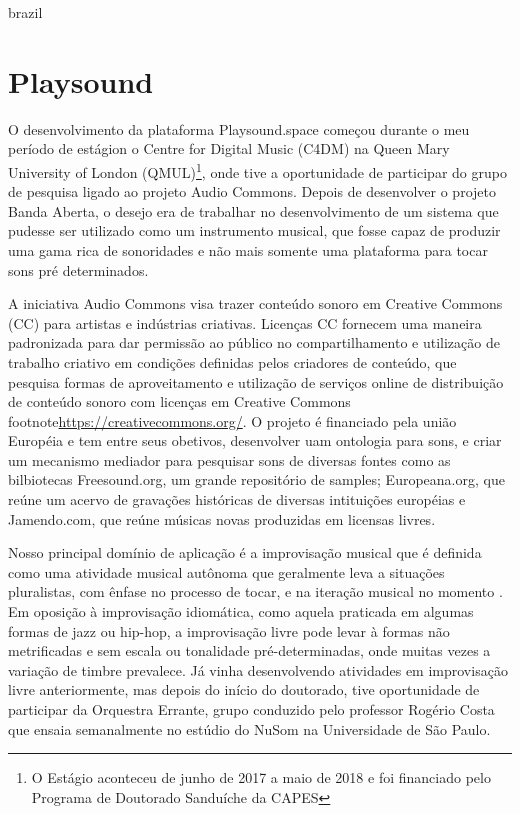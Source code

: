 \begin{otherlanguage*}{brazil}

\section{Playsound}

O desenvolvimento da plataforma Playsound.space começou durante o meu período de estágion o Centre for Digital Music (C4DM) na Queen Mary University of London (QMUL)\footnote{O Estágio aconteceu de junho de 2017 a maio de 2018 e foi financiado pelo Programa de Doutorado Sanduíche da CAPES}, onde tive a oportunidade de participar do grupo de pesquisa ligado ao projeto Audio Commons\cite{Font2016}. Depois de desenvolver o projeto Banda Aberta, o desejo era de trabalhar no desenvolvimento de um sistema que pudesse ser utilizado como um instrumento musical, que fosse capaz de produzir uma gama rica de sonoridades e não mais somente uma plataforma para tocar sons pré determinados. 

A iniciativa Audio Commons visa trazer conteúdo sonoro em Creative Commons (CC) para artistas e indústrias criativas. Licenças CC fornecem uma maneira padronizada para dar permissão ao público no compartilhamento e utilização de trabalho criativo em condições definidas pelos criadores de conteúdo, que pesquisa formas de aproveitamento e utilização de serviços online de distribuição de conteúdo sonoro com licenças em Creative Commons footnote{\url{https://creativecommons.org/}}. O projeto é financiado pela união Européia e tem entre seus obetivos, desenvolver uam ontologia para sons, e criar um mecanismo mediador para pesquisar sons de diversas fontes como as bilbiotecas Freesound.org, um grande repositório de samples; Europeana.org, que reúne um acervo de gravações históricas de diversas intituições européias e Jamendo.com, que reúne músicas novas produzidas em licensas livres.


Nosso principal domínio de aplicação é a improvisação musical que é definida como uma atividade musical autônoma \cite{Canonne2016} que geralmente leva a situações pluralistas, com ênfase no processo de tocar, e na iteração musical no momento \cite{BERGSTROEM-NIELSEN2016}. Em oposição à improvisação idiomática, como aquela praticada em algumas formas de jazz ou hip-hop, a improvisação livre pode levar à formas não metrificadas e sem escala ou tonalidade pré-determinadas, onde muitas vezes a variação de timbre prevalece\cite{Barthet:11a}. Já vinha desenvolvendo atividades em improvisação livre anteriormente, mas depois do início do doutorado, tive oportunidade de participar da Orquestra Errante, grupo conduzido pelo professor Rogério Costa que ensaia semanalmente no estúdio do NuSom na Universidade de São Paulo. 


\end{otherlanguage*}
